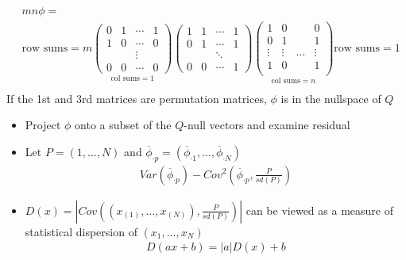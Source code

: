 \documentclass{beamer}
\newcommand{\V}{Var}
\newcommand{\cov}{Cov}
\newcommand{\I}{N}
\newcommand{\Q}{Q}
\newcommand{\colmean}[1]{\overline{\phi}_{\cdot #1}}
\begin{document}
\begin{frame}
  \begin{align}    
    &mn\phi=\\
    &\scriptstyle{\text{row sums}=m}
  \underset{\text{col sums} = 1}{  \begin{pmatrix}
      0 & 1 &\cdots & 1 \\
      1 & 0 &\cdots & 0\\
       &  & \vdots & \\
       0 & 0 &\cdots & 0
    \end{pmatrix}}
                      \begin{pmatrix}
                        1 & 1 & \cdots & 1\\
                        0 & 1 & \cdots & 1\\
                        & & \ddots & \\
                        0 & 0 & \cdots & 1
                      \end{pmatrix}
    \underset{\text{col sums}=n}{
                          \begin{pmatrix}                            
                            1 & 0 &  & 0\\
                            0 & 1 &  & 1\\
                            \vdots&\vdots & \ldots &\vdots \\
                            1 & 0 &  & 1\\
                          \end{pmatrix}}
    \scriptstyle{\text{row sums}=1}\\
  \end{align}
  If the 1st and 3rd matrices are permutation matrices, $\phi$ is in the nullspace of $\Q$
\end{frame}
\begin{frame}
  \begin{itemize}
    \item Project $\phi$ onto a subset of the $\Q$-null vectors and examine
      residual
      \item Let $P=(1,\ldots,\I)$ and $\colmean{p}=(\colmean{1},\ldots,\colmean{\I})$
  \begin{align}
    \V(\colmean{p})-\cov^2(\colmean{p},\frac{P}{sd(P)})
  \end{align}
\item $D(x)=|\cov((x_{(1)},\ldots,x_{(\I)}),\frac{P}{sd(P)})|$ can be viewed as a measure of statistical dispersion of $(x_1,\ldots,x_{\I})$
  \begin{align}
    D(ax+b)=|a|D(x)+b
  \end{align}
\end{itemize}
\end{frame}
\end{document}
